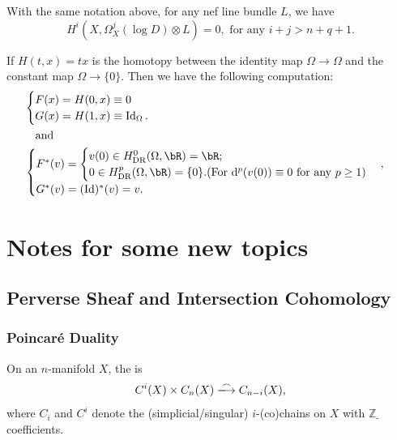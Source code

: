 \documentclass[lang=en,12pt]{beautybook}
\begin{document}
\begin{theorem}
  With the same notation above, for any nef line bundle $L$, we have
  $$
    H^i (X,\Omega_X^j (\log D)\otimes L)=0, \text{ for any } i+j> n+q+1.
  $$
\end{theorem}
\clearpage
\begin{fancybox}
  If $H(t,x)=tx$ is the homotopy between the identity map $\Omega\to\Omega$ and the constant map $\Omega\to \{0\}$. Then we have the following computation:
  \begin{align*}
     & \begin{cases}
         F(x)=H(0,x)\equiv 0 \\
         G(x)=H(1,x)\equiv \operatorname{Id}_\Omega.
       \end{cases} \\
     & \quad\text{and }                           \\
     & \begin{cases}
         F^*(v)=\begin{cases}
               v(0)\in H^0_{\textrm{DR}}(\Omega,\bR)=\bR; \\
               0\in H^p_{\textrm{DR}}(\Omega,\bR)=\{0\}. (\text{For } \dd^p (v(0))\equiv 0 \text{ for any }p\geq 1)
             \end{cases}, \\
         G^*(v)=(\operatorname{Id})^*(v)=v.
       \end{cases}
  \end{align*}
\end{fancybox}


\chapter{Notes for some new topics}

\section{Perverse Sheaf and Intersection Cohomology}

\subsection{Poincar\'e Duality}

\begin{definition}
  On an $n$-manifold $X$, the  is
  \[C^i(X)\times C_n(X)\xlongrightarrow[]{\frown} C_{n-i}(X),\]
  where $C_i$ and $C^i$ denote the (simplicial/singular) $i$-(co)chains on $X$ with $\mathbb{Z}_{\text {- }}$ coefficients.
\end{definition}
\end{document}
